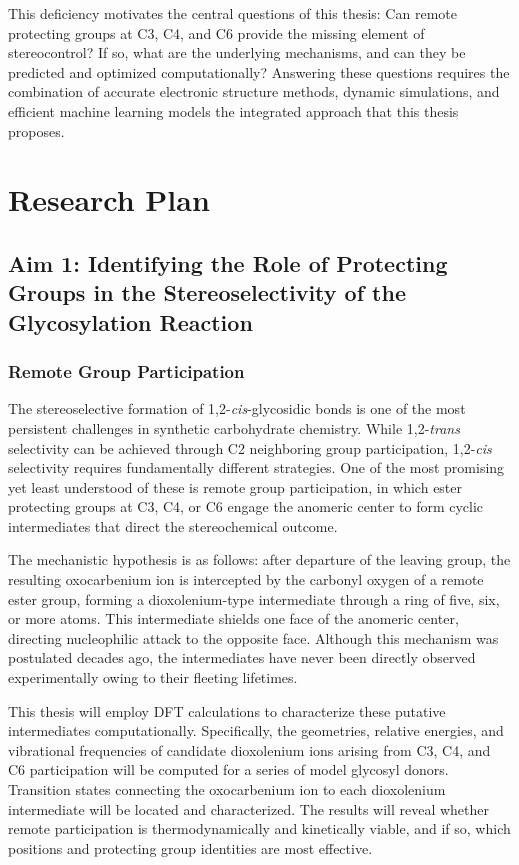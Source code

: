 \documentclass{article}
\begin{document}
This deficiency motivates the central questions of this thesis: Can remote protecting groups at C3, C4, and C6 provide the missing element of stereocontrol? If so, what are the underlying mechanisms, and can they be predicted and optimized computationally? Answering these questions requires the combination of accurate electronic structure methods, dynamic simulations, and efficient machine learning models the integrated approach that this thesis proposes.

\section{Research Plan}
\subsection{Aim 1: Identifying the Role of Protecting Groups in the Stereoselectivity of the Glycosylation Reaction}
\subsubsection{Remote Group Participation}
The stereoselective formation of 1,2-\textit{cis}-glycosidic bonds is one of the most persistent challenges in synthetic carbohydrate chemistry. While 1,2-\textit{trans} selectivity can be achieved through C2 neighboring group participation, 1,2-\textit{cis} selectivity requires fundamentally different strategies. One of the most promising yet least understood of these is remote group participation, in which ester protecting groups at C3, C4, or C6 engage the anomeric center to form cyclic intermediates that direct the stereochemical outcome.

The mechanistic hypothesis is as follows: after departure of the leaving group, the resulting oxocarbenium ion is intercepted by the carbonyl oxygen of a remote ester group, forming a dioxolenium-type intermediate through a ring of five, six, or more atoms. This intermediate shields one face of the anomeric center, directing nucleophilic attack to the opposite face. Although this mechanism was postulated decades ago, the intermediates have never been directly observed experimentally owing to their fleeting lifetimes.

This thesis will employ DFT calculations to characterize these putative intermediates computationally. Specifically, the geometries, relative energies, and vibrational frequencies of candidate dioxolenium ions arising from C3, C4, and C6 participation will be computed for a series of model glycosyl donors. Transition states connecting the oxocarbenium ion to each dioxolenium intermediate will be located and characterized. The results will reveal whether remote participation is thermodynamically and kinetically viable, and if so, which positions and protecting group identities are most effective.
\end{document}
